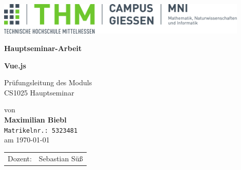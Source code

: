 \documentclass[%
    BCOR=8.25mm,         %
    DIV=12,              %
    parskip=half,                 %
    bibliography=totoc,     %
    headsepline=on,      %
]{scrbook}
\begin{document}
    \frontmatter

    \begin{titlepage}
        \begin{center}
            \includegraphics[width=0.9\textwidth]{img/mni-logo}

            \vspace{5cm}

            \Large\textbf{\sffamily Hauptseminar-Arbeit}

            \vspace{1cm}

            \huge\textbf{\sffamily Vue.js}

            \normalsize
            \vspace{1cm}

            Prüfungsleitung des Moduls \\
            CS1025 Hauptseminar

            von \\[1cm]

            \textbf{Maximilian Biebl} \\ \texttt{Matrikelnr.: 5323481}\\ [.5cm]
            am \today
        \end{center}
        \vfill
        \begin{tabular}{ll}
            Dozent: & Sebastian Süß
        \end{tabular}
    \end{titlepage}
    \cleardoubleemptypage
\end{document}
